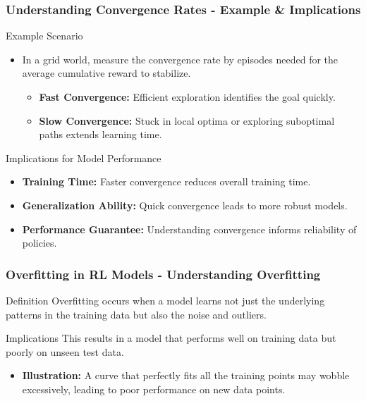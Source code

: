 \documentclass[aspectratio=169]{beamer}
\begin{document}
\begin{frame}[fragile]
    \frametitle{Understanding Convergence Rates - Example & Implications}
    \begin{block}{Example Scenario}
        \begin{itemize}
            \item In a grid world, measure the convergence rate by episodes needed for the average cumulative reward to stabilize.
            \begin{itemize}
                \item \textbf{Fast Convergence:} Efficient exploration identifies the goal quickly.
                \item \textbf{Slow Convergence:} Stuck in local optima or exploring suboptimal paths extends learning time.
            \end{itemize}
        \end{itemize}
    \end{block}
    \begin{block}{Implications for Model Performance}
        \begin{itemize}
            \item \textbf{Training Time:} Faster convergence reduces overall training time.
            \item \textbf{Generalization Ability:} Quick convergence leads to more robust models.
            \item \textbf{Performance Guarantee:} Understanding convergence informs reliability of policies.
        \end{itemize}
    \end{block}
\end{frame}

\begin{frame}[fragile]
    \frametitle{Overfitting in RL Models - Understanding Overfitting}
    \begin{block}{Definition}
        Overfitting occurs when a model learns not just the underlying patterns in the training data but also the noise and outliers.
    \end{block}
    \begin{block}{Implications}
        This results in a model that performs well on training data but poorly on unseen test data.
    \end{block}
    \begin{itemize}
        \item \textbf{Illustration:} A curve that perfectly fits all the training points may wobble excessively, leading to poor performance on new data points.
    \end{itemize}
\end{frame}
\end{document}
